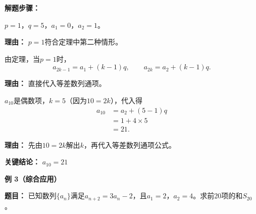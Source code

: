 \begin{examplebox}
	\textbf{\textcolor{CExample}{解题步骤：}}
	\begin{description}[style=nextline, leftmargin=2.8em, labelsep=0.5em, itemsep=0.45em]
		\item[\textbf{第一步（参数判断）：}] $p=1$，$q=5$，$a_1=0$，$a_2=1$。
			\par\textbf{理由：} $p=1$符合定理中第二种情形。
		\item[\textbf{第二步（等差公式）：}] 由定理，当$p=1$时，
			\[
				a_{2k-1}=a_1+(k-1)q,
				\qquad
				a_{2k}=a_2+(k-1)q.
			\]
			\par\textbf{理由：} 直接代入等差数列通项。
		\item[\textbf{第三步（定位求值）：}] $a_{10}$是偶数项，$k=5$（因为$10=2k$），代入得
			\[
				\begin{aligned}
					a_{10} &= a_2+(5-1)q \\
					&= 1+4\times5 \\
					&= 21.
			\end{aligned}
			\]
			\par\textbf{理由：} 先由$10=2k$解出$k$，再代入等差数列通项公式。
	\end{description}

	\textbf{\textcolor{CExample}{关键结论：}}
	\textbf{$a_{10}=21$}

	\medskip
	\textbf{\textcolor{CExample}{例 3（综合应用）}}

	\textbf{\textcolor{CExample}{题目：}}
	已知数列$\{a_n\}$满足$a_{n+2}=3a_n-2$，且$a_1=2$，$a_2=4$。求前20项的和$S_{20}$。


\end{examplebox}
